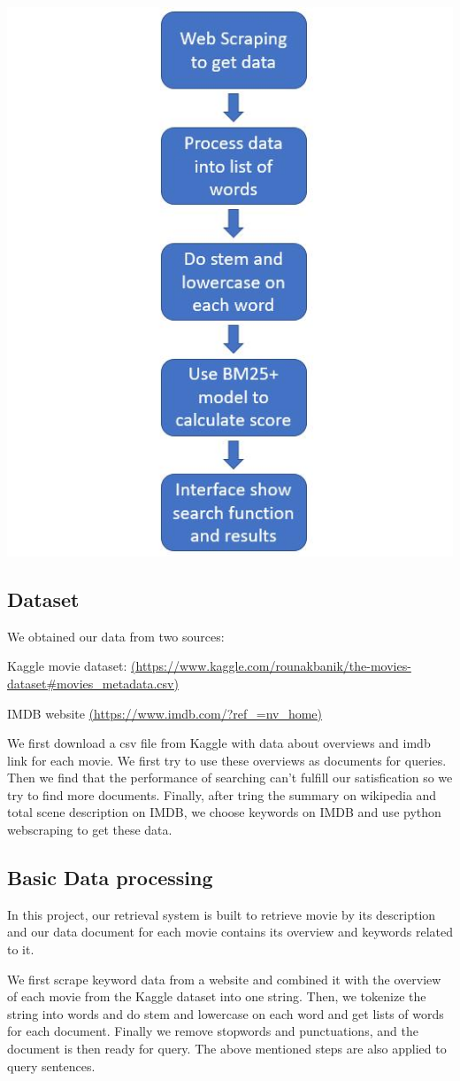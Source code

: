 \documentclass[letterpaper,10pt]{article}
\newenvironment{Figure}
  {\par\medskip\noindent\minipage{\linewidth}}
  {\endminipage\par\medskip}
\begin{document}
\begin{multicols}{2}
	\begin{Figure}
    	\center
  		\includegraphics[width=0.5\linewidth]{process.jpg}
	\end{Figure}

    \subsection{Dataset}
    We obtained our data from two sources:

    Kaggle movie dataset:
    \url{(https://www.kaggle.com/rounakbanik/the-movies-dataset#movies_metadata.csv)}

    IMDB website
    \url{(https://www.imdb.com/?ref_=nv_home)}
    
    We first download a csv file from Kaggle with data about overviews and imdb link for each movie. We first try to use these overviews as documents for queries. Then we find that the performance of searching can't fulfill our satisfication so we try to find more documents. Finally, after tring the summary on wikipedia and total scene description on IMDB, we choose keywords on IMDB and use python webscraping to get these data.

    \subsection{Basic Data processing}

    In this project, our retrieval system is built to retrieve movie by its description and our data document for each movie contains its overview and keywords related to it.
    
    We first scrape keyword data from a website and combined it with the overview of each movie from the Kaggle dataset into one string. Then, we tokenize the string into words and do stem and lowercase on each word and get lists of words for each document. Finally we remove stopwords and punctuations, and  the document is then ready for query. The above mentioned steps are also applied to query sentences.
    

\end{multicols}
\end{document}

